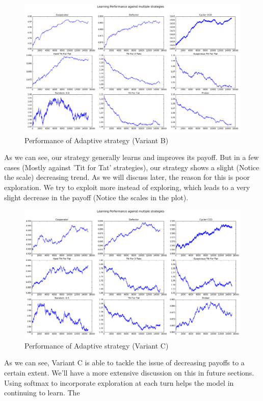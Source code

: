 \documentclass[a4paper]{article}
\begin{document}
	\begin{figure}[H]
	\centering
	\includegraphics[width=\textwidth]{learnerInitialB.png}
	\caption{{Performance of Adaptive strategy (Variant B)}}
	\end{figure}

	As we can see, our strategy generally learns and improves its payoff. But in a few cases (Mostly against 'Tit for Tat' strategies), our strategy shows a slight (Notice the scale) decreasing trend. As we will discuss later, the reason for this is poor exploration. We try to exploit more instead of exploring, which leads to a very slight decrease in the payoff (Notice the scales in the plot).

	\begin{figure}[H]
	\centering
	\includegraphics[width=\textwidth]{learnerInitialC_b8.png}
	\caption{{Performance of Adaptive strategy (Variant C)}}
	\end{figure}

	As we can see, Variant C is able to tackle the issue of decreasing payoffs to a certain extent. We'll have a more extensive discussion on this in future sections. Using softmax to incorporate exploration at each turn helps the model in continuing to learn. The 
	
\end{document}
